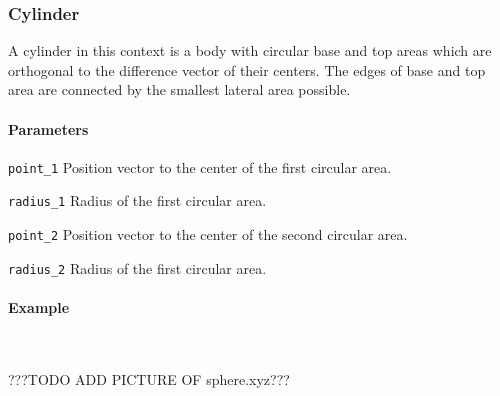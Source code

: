 \subsubsection{Cylinder}
A cylinder in this context is a body with circular base and top areas which are orthogonal to the difference vector of their centers. The edges of base and top area are connected by the smallest lateral area possible.

\paragraph{Parameters}
\begin{description}
 \item{\lstinline{point_1}} Position vector to the center of the first circular area.
 \item{\lstinline{radius_1}} Radius of the first circular area.
 \item{\lstinline{point_2}} Position vector to the center of the second circular area.
 \item{\lstinline{radius_2}} Radius of the first circular area.
\end{description}

\paragraph{Example}\ 


???TODO ADD PICTURE OF sphere.xyz???